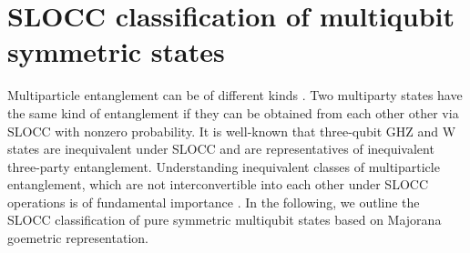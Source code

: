 \section{SLOCC classification of multiqubit symmetric states}\label{classification}

Multiparticle entanglement  can be of different kinds \cite{Dur}. Two multiparty states have the same kind of entanglement if they can be obtained from each other other via SLOCC with nonzero probability. It is well-known that three-qubit GHZ and W states are inequivalent under SLOCC and are representatives of inequivalent three-party entanglement. Understanding  inequivalent classes of multiparticle entanglement, which are not interconvertible into each other under SLOCC operations is of fundamental importance \cite{Dur,Ver,Lamata,solano}. In the following, we outline \cite{solano} the SLOCC classification of pure symmetric multiqubit states based on Majorana goemetric representation.

